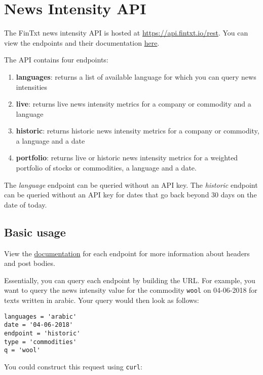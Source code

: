 \documentclass[]{book}
\providecommand{\tightlist}{%
  \setlength{\itemsep}{0pt}\setlength{\parskip}{0pt}}
\theoremstyle{definition}
\theoremstyle{definition}
\theoremstyle{definition}
\theoremstyle{remark}
\begin{document}
\chapter{News Intensity API}\label{theapi}

The FinTxt news intensity API is hosted at
\url{https://api.fintxt.io/rest}. You can view the endpoints and their
documentation \href{https://api.fintxt.io/rest/__swagger__/}{here}.

The API contains four endpoints:

\begin{enumerate}
\def\labelenumi{\arabic{enumi}.}
\tightlist
\item
  \textbf{languages}: returns a list of available language for which you
  can query news intensities
\item
  \textbf{live}: returns live news intensity metrics for a company or
  commodity and a language
\item
  \textbf{historic}: returns historic news intensity metrics for a
  company or commodity, a language and a date
\item
  \textbf{portfolio}: returns live or historic news intensity metrics
  for a weighted portfolio of stocks or commodities, a language and a
  date.
\end{enumerate}

The \emph{language} endpoint can be queried without an API key. The
\emph{historic} endpoint can be queried without an API key for dates
that go back beyond 30 days on the date of today.

\section{Basic usage}\label{basic-usage}

View the \href{https://api.fintxt.io/rest/__swagger__/}{documentation}
for each endpoint for more information about headers and post bodies.

Essentially, you can query each endpoint by building the URL. For
example, you want to query the news intensity value for the commodity
\texttt{wool} on 04-06-2018 for texts written in arabic. Your query
would then look as follows:

\begin{verbatim}
languages = 'arabic'
date = '04-06-2018'
endpoint = 'historic'
type = 'commodities'
q = 'wool'
\end{verbatim}

You could construct this request using \texttt{curl}:
\end{document}
